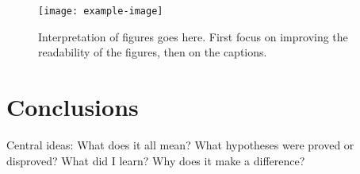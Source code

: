 \documentclass[twoside,twocolumn,9pt]{article}
\renewcommand{\refname}{Notes and references}
\begin{document}
\begin{center}
    \begin{figure}
        \texttt{[image: example-image]}
        \caption{Interpretation of figures goes here. First focus on improving the readability of the figures, then on the captions.}
        \label{fig:my_label}
    \end{figure}
\end{center}

\section{Conclusions}

Central ideas: What does it all mean? What hypotheses were proved or disproved? What did I learn? Why does it make a difference?




\balance


\end{document}
